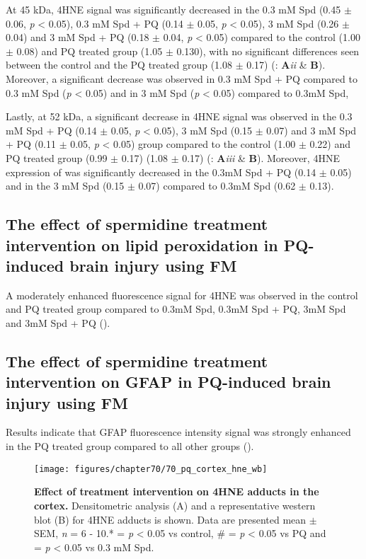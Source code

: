 At 45 kDa, 4HNE signal was significantly decreased in the 0.3 mM Spd (0.45 $\pm$ 0.06, \textit{p} < 0.05), 0.3 mM Spd + PQ (0.14 $\pm$ 0.05, \textit{p} < 0.05), 3 mM Spd (0.26 $\pm$ 0.04) and 3 mM Spd + PQ (0.18 $\pm$ 0.04, \textit{p} < 0.05) compared to the control (1.00 $\pm$ 0.08) and PQ treated group (1.05 $\pm$ 0.130), with no significant differences seen between the control and the PQ treated group (1.08 $\pm$ 0.17) (: \textbf{A}\textit{ii} \& \textbf{B}). Moreover, a significant decrease was observed in 0.3 mM Spd + PQ compared to 0.3 mM Spd (\textit{p} < 0.05) and in 3 mM Spd (\textit{p} < 0.05) compared to 0.3mM Spd, 

Lastly, at 52 kDa, a significant decrease in 4HNE signal was observed in the 0.3 mM Spd + PQ (0.14 $\pm$ 0.05, \textit{p} < 0.05), 3 mM Spd (0.15 $\pm$ 0.07) and 3 mM Spd + PQ (0.11 $\pm$ 0.05, \textit{p} < 0.05) group compared to the control (1.00 $\pm$ 0.22) and PQ treated group (0.99 $\pm$ 0.17) (1.08 $\pm$ 0.17) (: \textbf{A}\textit{iii} \& \textbf{B}). Moreover, 4HNE expression of was significantly decreased in the 0.3mM Spd + PQ (0.14 $\pm$ 0.05) and in the 3 mM Spd (0.15 $\pm$ 0.07) compared to 0.3mM Spd (0.62 $\pm$ 0.13).

\subsection{The effect of spermidine treatment intervention on lipid peroxidation in PQ-induced brain injury using FM}
A moderately enhanced fluorescence signal for 4HNE was observed in the control and PQ treated group compared to 0.3mM Spd, 0.3mM Spd + PQ, 3mM Spd and 3mM Spd + PQ ().

\subsection{The effect of spermidine treatment intervention on GFAP in PQ-induced brain injury using FM}
Results indicate that GFAP fluorescence intensity signal was strongly enhanced in the PQ treated group compared to all other groups ().

\begin{landscape}
\begin{figure}[!htbp]
\center
  \texttt{[image: figures/chapter70/70\_pq\_cortex\_hne\_wb]}
  \caption[Effect of treatment intervention on 4HNE adducts in the cortex]{\textbf{Effect of treatment intervention on 4HNE adducts in the cortex.} Densitometric analysis (A) and a representative western blot (B) for 4HNE adducts is shown. Data are presented  mean $\pm$ SEM, \textit{n} = 6 - 10.* = \textit{p} < 0.05 vs control, \# = \textit{p} < 0.05 vs PQ and \@ = \textit{p} < 0.05 vs 0.3 mM Spd.}
  \label{fig:70_pq_cortex_hne_wb}
\end{figure} 
\end{landscape}


